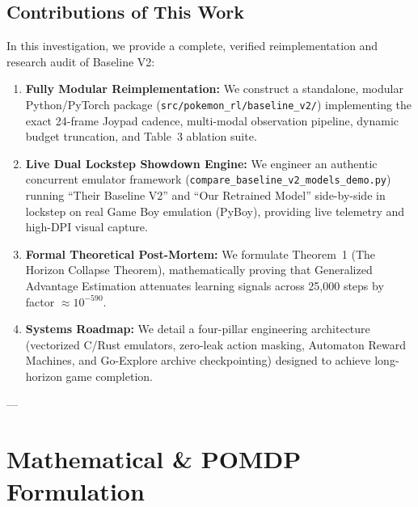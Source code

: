 \documentclass[conference]{IEEEtran}
\begin{document}
\subsection{Contributions of This Work}
In this investigation, we provide a complete, verified reimplementation and research audit of Baseline V2:
\begin{enumerate}
    \item \textbf{Fully Modular Reimplementation:} We construct a standalone, modular Python/PyTorch package (\texttt{src/}\allowbreak\texttt{pokemon\_rl/}\allowbreak\texttt{baseline\_v2/}) implementing the exact 24-frame Joypad cadence, multi-modal observation pipeline, dynamic budget truncation, and Table~3 ablation suite.
    \item \textbf{Live Dual Lockstep Showdown Engine:} We engineer an authentic concurrent emulator framework (\texttt{compare\_baseline\_v2\_}\allowbreak\texttt{models\_demo.py}) running ``Their Baseline V2'' and ``Our Retrained Model'' side-by-side in lockstep on real Game Boy emulation (PyBoy), providing live telemetry and high-DPI visual capture.
    \item \textbf{Formal Theoretical Post-Mortem:} We formulate Theorem~1 (The Horizon Collapse Theorem), mathematically proving that Generalized Advantage Estimation attenuates learning signals across 25,000 steps by factor $\approx 10^{-590}$.
    \item \textbf{Systems Roadmap:} We detail a four-pillar engineering architecture (vectorized C/Rust emulators, zero-leak action masking, Automaton Reward Machines, and Go-Explore archive checkpointing) designed to achieve long-horizon game completion.
\end{enumerate}

---

\section{Mathematical \& POMDP Formulation}
\end{document}

